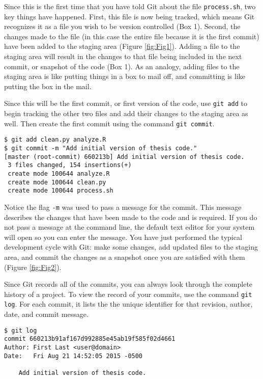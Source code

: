 Since this is the first time that you have told Git about the file \verb|process.sh|, two key things have happened.
First, this file is now being tracked, which means Git recognizes it as a file you wish to be version controlled (Box 1).
Second, the changes made to the file (in this case the entire file because it is the first commit) have been added to the staging area (Figure \ref{fig:Fig1}).
Adding a file to the staging area will result in the changes to that file being included in the next commit, or snapshot of the code (Box 1).
As an analogy, adding files to the staging area is like putting things in a box to mail off, and committing is like putting the box in the mail.

Since this will be the first commit, or first version of the code, use \verb|git add| to begin tracking the other two files and add their changes to the staging area as well.
Then create the first commit using the command \verb|git commit|.

\begin{verbatim}
$ git add clean.py analyze.R
$ git commit -m "Add initial version of thesis code."
[master (root-commit) 660213b] Add initial version of thesis code.
 3 files changed, 154 insertions(+)
 create mode 100644 analyze.R
 create mode 100644 clean.py
 create mode 100644 process.sh
\end{verbatim}

Notice the flag \verb|-m| was used to pass a message for the commit.
This message describes the changes that have been made to the code and is required.
If you do not pass a message at the command line, the default text editor for your system will open so you can enter the message.
You have just performed the typical development cycle with Git:
make some changes, add updated files to the staging area, and commit the changes as a snapshot once you are satisfied with them (Figure \ref{fig:Fig2}).

Since Git records all of the commits, you can always look through the complete history of a project.
To view the record of your commits, use the command \verb|git log|.
For each commit, it lists the the unique identifier for that revision, author, date, and commit message.

\begin{verbatim}
$ git log
commit 660213b91af167d992885e45ab19f585f02d4661
Author: First Last <user@domain>
Date:   Fri Aug 21 14:52:05 2015 -0500

    Add initial version of thesis code.
\end{verbatim}

